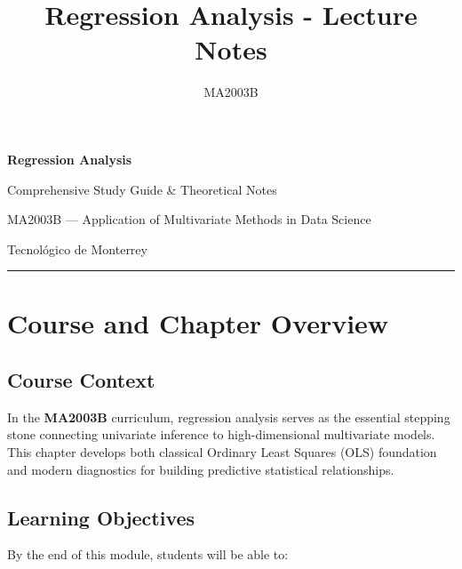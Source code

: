 \documentclass[
]{article}
\title{Regression Analysis - Lecture Notes}
\author{MA2003B}
\date{}
\begin{document}
\maketitle

\textbf{Regression Analysis}

Comprehensive Study Guide \& Theoretical Notes

MA2003B --- Application of Multivariate Methods in Data Science

Tecnológico de Monterrey

\begin{center}\rule{0.5\linewidth}{0.5pt}\end{center}

\textbf{ }

\section{Course and Chapter Overview}

\textbf{ }

\subsection{Course Context}

In the \textbf{MA2003B} curriculum, regression analysis serves as the
essential stepping stone connecting univariate inference to
high-dimensional multivariate models. This chapter develops both
classical Ordinary Least Squares (OLS) foundation and modern diagnostics
for building predictive statistical relationships.

\textbf{ }

\subsection{Learning Objectives}

By the end of this module, students will be able to:
\end{document}
